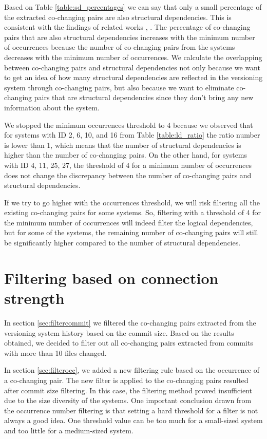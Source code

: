 \documentclass[12pt, a4paper, twoside]{report}
\begin{document}
Based on Table \ref{table:sd_percentages} we can say that only a small percentage of the extracted co-changing pairs are also structural dependencies. This is consistent with the findings of related works \cite{DBLP:journals/jss/AjienkaC17}, \cite{DBLP:journals/ese/AjienkaCC18}. 
The percentage of co-changing pairs that are also structural dependencies increases with the minimum number of occurrences because the number of co-changing pairs from the systems decreases with the minimum number of occurrences. 
We calculate the overlapping between co-changing pairs and structural dependencies not only because we want to get an idea of how many structural dependencies are reflected in the versioning system through co-changing pairs, but also because we want to eliminate co-changing pairs that are structural dependencies since they don't bring any new information about the system.

We stopped the minimum occurrences threshold to 4 because we observed that for systems with ID 2, 6, 10, and 16 from Table \ref{table:ld_ratio} the ratio number is lower than 1, which means that the number of structural dependencies is higher than the number of co-changing pairs. On the other hand, for systems with ID 4, 11, 25, 27, the threshold of 4 for a minimum number of occurrences does not change the discrepancy between the number of co-changing pairs and structural dependencies.

If we try to go higher with the occurrences threshold, we will risk filtering all the existing co-changing pairs for some systems.
So, filtering with a threshold of 4 for the minimum number of occurrences will indeed filter the logical dependencies, but for some of the systems, the remaining number of co-changing pairs will still be significantly higher compared to the number of structural dependencies.




\section{Filtering based on connection strength}
\label{sec:filterstrength}

In section \ref{sec:filtercommit} we filtered the co-changing pairs extracted from the versioning system history based on the commit size. Based on the results obtained, we decided to filter out all co-changing pairs extracted from commits with more than 10 files changed. 

In section \ref{sec:filterocc}, we added a new filtering rule based on the occurrence of a co-changing pair. The new filter is applied to the co-changing pairs resulted after commit size filtering. In this case, the filtering method proved insufficient due to the size diversity of the systems. One important conclusion drawn from the occurrence number filtering is that setting a hard threshold for a filter is not always a good idea. One threshold value can be too much for a small-sized system and too little for a medium-sized system. 
\end{document}
